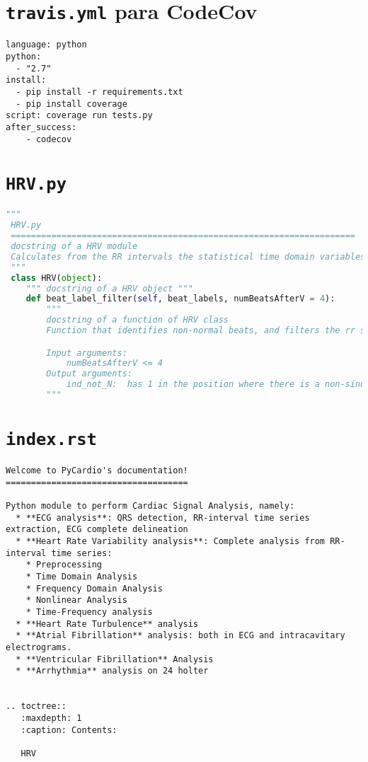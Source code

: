\section{\texttt{travis.yml} para CodeCov}
\begin{lstlisting}[caption={\texttt{.travis.yml} para integrar CodeCov},label=travisCodecov]
language: python
python:
  - "2.7"
install:
  - pip install -r requirements.txt
  - pip install coverage
script: coverage run tests.py
after_success:
    - codecov
\end{lstlisting}

\section{\texttt{HRV.py}}
\begin{lstlisting}[language=python,caption=HRV.py,label=docstring]
""" 
 HRV.py 
 ====================================================================
 docstring of a HRV module
 Calculates from the RR intervals the statistical time domain variables and the geometrical variables to characterize the heart rate variability (HRV).The RR intervals used are all of them previous to valid tachograms according to the conditions evaluated in the characterization of the heart rate turbulence (HRT). 
 """
 class HRV(object):
    """ docstring of a HRV object """
    def beat_label_filter(self, beat_labels, numBeatsAfterV = 4):
        """
        docstring of a function of HRV class
        Function that identifies non-normal beats, and filters the rr signal to produce a vector identifying the positions where are non-normal beats.

        Input arguments:
            numBeatsAfterV <= 4
        Output arguments:
            ind_not_N:  has 1 in the position where there is a non-sinusal beat as classified by the label information.
        """
\end{lstlisting}

\section{\texttt{index.rst}}
\begin{lstlisting}[caption=\texttt{index.rst},label=index]
Welcome to PyCardio's documentation!
====================================

Python module to perform Cardiac Signal Analysis, namely:
  * **ECG analysis**: QRS detection, RR-interval time series extraction, ECG complete delineation
  * **Heart Rate Variability analysis**: Complete analysis from RR-interval time series:
    * Preprocessing
    * Time Domain Analysis
    * Frequency Domain Analysis
    * Nonlinear Analysis
    * Time-Frequency analysis
  * **Heart Rate Turbulence** analysis
  * **Atrial Fibrillation** analysis: both in ECG and intracavitary electrograms.
  * **Ventricular Fibrillation** Analysis
  * **Arrhythmia** analysis on 24 holter


.. toctree::
   :maxdepth: 1
   :caption: Contents:

   HRV

\end{lstlisting}

